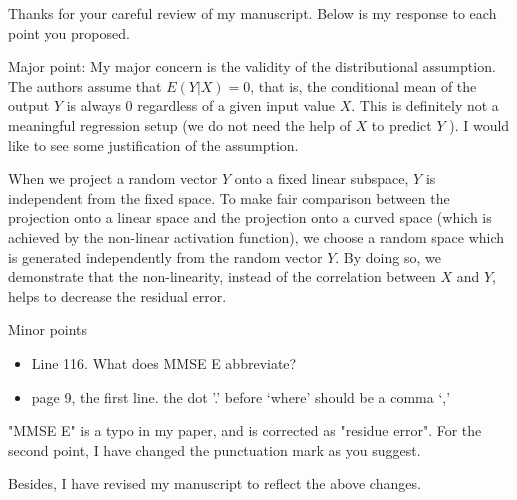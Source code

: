 \documentclass[answers]{exam}
\begin{document}
\pagestyle{empty}
Thanks for your careful review of my manuscript. Below is my response to each point you proposed.
\begin{questions}
\question
Major point:
My major concern is the validity of the distributional assumption.
The authors assume that $E(Y |X) = 0$,
that is, the conditional mean of the output $Y$
is always 0 regardless of a given input value $X$. This is definitely not a meaningful
regression setup (we do not need the help of $X$ to predict $Y$ ).
I would like to see
some justification of the assumption.
\begin{solution}
    When we project a random vector $Y$ onto a fixed linear subspace,
    $Y$ is independent from the fixed space.
    To make fair comparison between the projection onto a linear space and the projection onto
    a curved space (which is achieved by the non-linear activation function), we choose a random space which is generated independently from the random vector
    $Y$. By doing so, we demonstrate that the non-linearity, instead of the correlation between $X$ and $Y$,
    helps to decrease the residual error.
\end{solution}
\question Minor points
\begin{itemize}
\item Line 116. What does MMSE E abbreviate?
\item page 9, the first line. the dot ’.’ before ‘where’ should be a comma ‘,’
\end{itemize}
\begin{solution}
    "MMSE E" is a typo in my paper, and is corrected as 
    "residue error".
    For the second point, I have changed the punctuation mark as you suggest.   
\end{solution}
\end{questions}
Besides, I have revised my manuscript to reflect the above changes.
\end{document}
